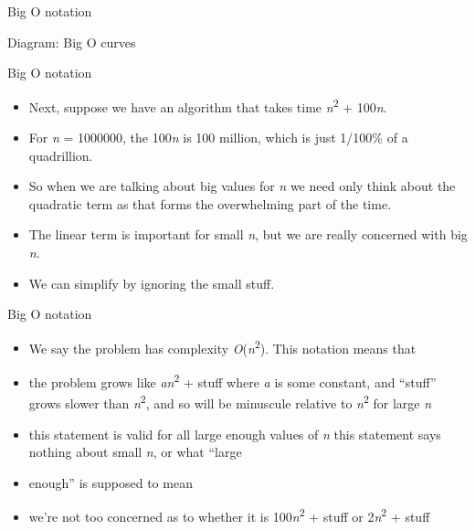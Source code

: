 \documentclass{beamer}
\begin{document}
\begin{frame}

Big O notation

Diagram: Big O curves

\end{frame} \begin{frame}

Big O notation

\begin{itemize}
\item Next, suppose we have an algorithm that takes time \textit{n}\textsuperscript{2 }+ 100\textit{n}.
\item For \textit{n }= 1000000, the 100\textit{n }is 100 million, which is just 1/100\% of a quadrillion.
\item So when we are talking about big values for \textit{n }we need only think about the quadratic term as that forms
the overwhelming part of the time.
\item The linear term is important for small \textit{n}, but we are really concerned with big \textit{n}.
\item We can simplify by ignoring the small stuff.
\end{itemize}

\end{frame} \begin{frame}

Big O notation

\begin{itemize}
\item We say the problem has complexity \textit{O}(\textit{n}\textsuperscript{2}). This notation means that
\item the problem grows like \textit{an}\textsuperscript{2 }+ stuff where \textit{a }is some constant, and ``stuff''
grows slower than \textit{n}\textsuperscript{2}, and so will be minuscule relative to \textit{n}\textsuperscript{2 }for
large \textit{n}
\item this statement is valid for all large enough values of \textit{n }this statement says nothing about small
\textit{n}, or what ``large
\item enough'' is supposed to mean
\item we're not too concerned as to whether it is 100\textit{n}\textsuperscript{2 }+ stuff or
2\textit{n}\textsuperscript{2 }+ stuff
\end{itemize}
\end{frame} \begin{frame}


\end{frame}
\end{document}

